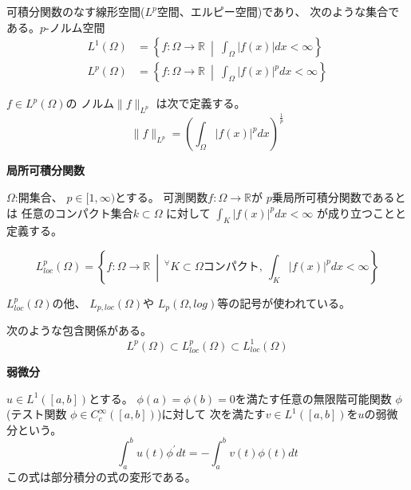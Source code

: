 \documentclass[12pt,b5paper]{ltjsarticle}
\begin{document}
\dotfill

可積分関数のなす線形空間($L^{p}$空間、エルピー空間)であり、
次のような集合である。$p$-ノルム空間
\begin{align}
 L^{1}(\Omega) &= \left\{ f:\Omega\to\mathbb{R} \:\middle|\: \int_{\Omega}\lvert f(x)\rvert dx < \infty \right\}\\
 L^{p}(\Omega) &= \left\{ f:\Omega\to\mathbb{R} \:\middle|\: \int_{\Omega}\lvert f(x)\rvert^{p} dx < \infty \right\}
\end{align}

$f\in L^{p}(\Omega)$の
ノルム$\| f \|_{L^{p}}$
は次で定義する。
\begin{equation}
 \| f \|_{L^{p}}
  =
  \left( \int_{\Omega} \lvert f(x) \rvert^{p} dx \right)^{\frac{1}{p}}
\end{equation}


\dotfill

\textbf{局所可積分関数}

$\Omega$:開集合、
$p\in [1,\infty)$とする。
可測関数$f:\Omega\to\mathbb{R}$が
$p$乗局所可積分関数であるとは
任意のコンパクト集合$k\subset \Omega$
に対して
$\int_{K} \lvert f(x) \rvert^{p} dx < \infty$
が成り立つことと定義する。

\begin{equation}
 L^{p}_{loc}(\Omega)
  =\left\{
    f:\Omega\to \mathbb{R} %
    \:\middle|\:
    {}^{\forall}K \subset \Omega コンパクト,\:
    \int_{K} \lvert f(x) \rvert^{p} dx < \infty
   \right\}
\end{equation}

$L^{p}_{loc}(\Omega)$の他、
$L_{p,loc}(\Omega)$や
$L_{p}(\Omega,log)$等の記号が使われている。

次のような包含関係がある。
\begin{equation}
 L^{p}(\Omega)
  \subset L^{p}_{loc}(\Omega)
  \subset L^{1}_{loc}(\Omega)
\end{equation}


\dotfill

\textbf{弱微分}

$u\in L^{1}([a,b])$とする。
$\phi(a)=\phi(b)=0$を満たす任意の無限階可能関数
$\phi$(テスト関数 $\phi\in C_{c}^{\infty}([a,b])$)に対して
次を満たす$v\in L^{1}([a,b])$を$u$の弱微分という。
\begin{equation}
 \int_{a}^{b}u(t)\phi^{\prime}dt = -\int_{a}^{b} v(t)\phi(t) dt
\end{equation}
この式は部分積分の式の変形である。
\end{document}

